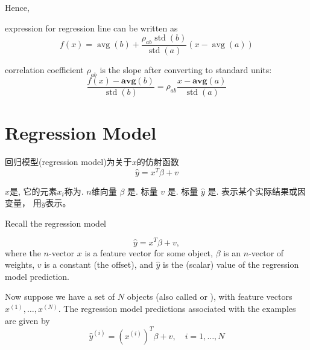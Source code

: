 Hence, 

\begin{corollary}
    expression for regression line can be written as
\begin{equation}
f(x)=\operatorname{avg}(b)+\frac{\rho_{a b} \operatorname{std}(b)}{\operatorname{std}(a)}(x-\operatorname{avg}(a))
\end{equation}
\end{corollary}

\begin{corollary}
    correlation coefficient $ \rho_{a b} $ is the slope after converting to standard units:
\begin{equation}
\frac{f(x)-\mathbf{a v g}(b)}{\operatorname{std}(b)}=\rho_{a b} \frac{x-\mathbf{a v g}(a)}{\operatorname{std}(a)}
\end{equation}
\end{corollary}



\section{Regression Model}


\begin{definition}
    回归模型(regression model)为关于$x$的仿射函数
    \begin{equation} \hat{y}=x^{T} \beta+v \end{equation}

    $x$是, 它的元素$x_i$称为. $n$维向量 $ \beta $ 是. 标量 $ v $ 是. 标量 $ \hat{y} $ 是. 表示某个实际结果或因变量， 用$y$表示。 
\end{definition}

Recall the regression model

\begin{problem}
    \begin{equation}
    \hat{y}=x^{T} \beta+v,
    \end{equation}
    where the $ n $-vector $ x $ is a feature vector for some object, $ \beta $ is an $ n $-vector of weights, $ v $ is a constant (the offset), and $ \hat{y} $ is the (scalar) value of the regression model prediction.
\end{problem}

Now suppose we have a set of $ N $ objects (also called  or ), with feature vectors $ x^{(1)}, \ldots, x^{(N)} $. The regression model predictions associated with the examples are given by
\begin{equation}
\hat{y}^{(i)}=\left(x^{(i)}\right)^{T} \beta+v, \quad i=1, \ldots, N
\end{equation}


